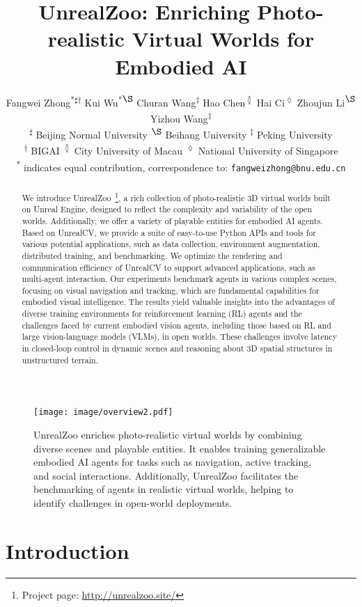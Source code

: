 \documentclass{article}
\title{UnrealZoo: Enriching Photo-realistic Virtual Worlds for Embodied AI}
\author{
Fangwei Zhong\textsuperscript{*$\sharp$$\dagger$}
Kui Wu\textsuperscript{*$\S$}
Churan Wang\textsuperscript{$\ddag$}
Hao Chen\textsuperscript{$\between$}
Hai Ci\textsuperscript{$\lozenge$}
Zhoujun Li\textsuperscript{$\S$}
Yizhou Wang\textsuperscript{$\ddag$}\\
\textsuperscript{$\sharp$} Beijing Normal University  
\textsuperscript{$\S$} Beihang University  
\textsuperscript{$\ddag$} Peking University 
\\
\textsuperscript{$\dagger$} BIGAI 
\textsuperscript{$\between$} City University of Macau  
\textsuperscript{$\lozenge$} National University of Singapore\\
\textsuperscript{*} indicates equal contribution, 
\Letter correspondence to: \texttt{fangweizhong@bnu.edu.cn} \\
}
\begin{document}
\maketitle

\vspace{-0.3cm}
\begin{abstract}

We introduce UnrealZoo~\footnote{Project page: \url{http://unrealzoo.site/}}, a rich collection of photo-realistic 3D virtual worlds built on Unreal Engine, designed to reflect the complexity and variability of the open worlds. Additionally, we offer a variety of playable entities for embodied AI agents. Based on UnrealCV, we provide a suite of easy-to-use Python APIs and tools for various potential applications, such as data collection, environment augmentation, distributed training, and benchmarking.
We optimize the rendering and communication efficiency of UnrealCV to support advanced applications, such as multi-agent interaction.
Our experiments benchmark agents in various complex scenes, focusing on visual navigation and tracking, which are fundamental capabilities for embodied visual intelligence.
The results yield valuable insights into the advantages of diverse training environments for reinforcement learning (RL) agents and the challenges faced by current embodied vision agents, including those based on RL and large vision-language models (VLMs), in open worlds. These challenges involve latency in closed-loop control in dynamic scenes and reasoning about 3D spatial structures in unstructured terrain.
\vspace{-0.3cm}
\end{abstract} 

\begin{figure}[h]
    \centering
    \texttt{[image: image/overview2.pdf]}
    \caption{
    UnrealZoo enriches photo-realistic virtual worlds by combining diverse scenes and playable entities. It enables training generalizable embodied AI agents for tasks such as navigation, active tracking, and social interactions. Additionally, UnrealZoo facilitates the benchmarking of agents in realistic virtual worlds, helping to identify challenges in open-world deployments.
    }
    \label{fig:overview}
\end{figure}

\section{Introduction}
\end{document}
